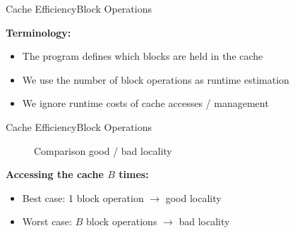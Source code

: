 
\begin{frame}{Cache Efficiency}{Block Operations}
  \vspace{-2.0em}
  \begin{figure}%
    \begin{adjustbox}{width=\linewidth}%
    \end{adjustbox}%
    \label{fig:caching:cache_quanting2}
  \end{figure}%
  \textbf{Terminology:}
  \begin{itemize}
    \item<2->
      The program defines which blocks are held in the
      {\color{Mittel-Blau}cache}
    \item<3->
      We use the number of {\color{Mittel-Blau}block operations} as runtime
      estimation
    \item<4->
      We ignore runtime costs of cache accesses / management
  \end{itemize}
\end{frame}


\begin{frame}{Cache Efficiency}{Block Operations}
  \vspace{-2.0em}
  \begin{figure}%
    \begin{adjustbox}{width=\linewidth}%
    \end{adjustbox}%
    \caption{Comparison good / bad locality}
    \label{fig:caching:memory_locality}
  \end{figure}%
  \textbf{Accessing the cache {\color{Mittel-Blau}$B$} times:}
  \begin{itemize}
    \item
      {\color{Mittel-Blau}Best case}:
      1 block operation $\rightarrow$ good locality
    \item
      {\color{Mittel-Blau}Worst case}:
      {\color{Mittel-Blau}$B$} block operations $\rightarrow$ bad locality
  \end{itemize}
\end{frame}


